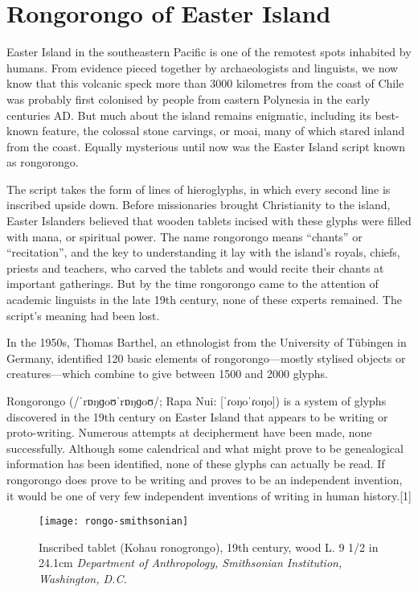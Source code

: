 \chapter{Rongorongo of Easter Island}

Easter Island in the southeastern Pacific is one of the remotest spots
inhabited by humans. From evidence pieced together by archaeologists and
linguists, we now know that this volcanic speck more than 3000 kilometres from
the coast of Chile was probably first colonised by people from eastern Polynesia
in the early centuries AD. But much about the island remains enigmatic,
including its best-known feature, the colossal stone carvings, or moai,
many of which stared inland from the coast. Equally mysterious until now was the
Easter Island script known as rongorongo.

The script takes the form of lines of hieroglyphs, in which every second line
is inscribed upside down. Before missionaries brought Christianity to the
island, Easter Islanders believed that wooden tablets incised with these glyphs
were filled with mana, or spiritual power. The name rongorongo means
“chants” or “recitation”, and the key to understanding it lay with the island’s
royals, chiefs, priests and teachers, who carved the tablets and would recite
their chants at important gatherings. But by the time rongorongo came to the
attention of academic linguists in the late 19th century, none of these experts
remained. The script’s meaning had been lost.

In the 1950s, Thomas Barthel, an ethnologist from the University of
Tübingen in Germany, identified 120 basic elements of
rongorongo—mostly stylised objects or creatures—which combine to
give between 1500 and 2000 glyphs. 

Rongorongo (/ˈrɒŋɡoʊˈrɒŋɡoʊ/; Rapa Nui: [ˈɾoŋoˈɾoŋo]) is a system of glyphs discovered in the 19th century on Easter Island that appears to be writing or proto-writing. Numerous attempts at decipherment have been made, none successfully. Although some calendrical and what might prove to be genealogical information has been identified, none of these glyphs can actually be read. If rongorongo does prove to be writing and proves to be an independent invention, it would be one of very few independent inventions of writing in human history.[1]

\begin{figure}[htbp]
\parindent0pt

\texttt{[image: rongo-smithsonian]}
\caption{Inscribed tablet (Kohau ronogrongo), 19th century, wood L. 9 1/2 in 24.1cm \textit{Department of Anthropology, Smithsonian Institution, Washington, D.C.}}

\end{figure}

